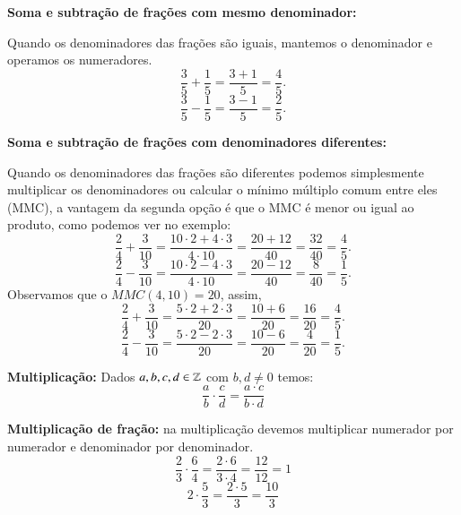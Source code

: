  \vskip0.3cm

 \begin{exem}
  \textbf{Soma e subtração de frações com mesmo denominador:}

   Quando os denominadores das frações são iguais, mantemos o denominador e operamos os numeradores.
    \vskip0.3cm
   \[\frac{3}{5} + \frac{1}{5}= \frac{3+1}{5}= \frac{4}{5} .\]
    \vskip0.3cm
   \[\frac{3}{5} - \frac{1}{5}= \frac{3-1}{5}= \frac{2}{5} .\]
 \end{exem}

 \begin{exem}
 \textbf{Soma e subtração de frações com denominadores diferentes:}

   Quando os denominadores das frações são diferentes podemos simplesmente multiplicar os denominadores ou calcular o mínimo múltiplo comum entre eles (MMC), a vantagem da segunda opção é que o MMC é menor ou igual ao produto, como podemos ver no exemplo:
    \vskip0.3cm
   \[\frac{2}{4} + \frac{3}{10}= \frac{10 \cdot 2 + 4 \cdot 3}{4 \cdot 10}= \frac{20 + 12}{40}= \frac{32}{40}= \frac{4}{5} .\]
    \vskip0.3cm
   \[\frac{2}{4} - \frac{3}{10}= \frac{10 \cdot 2 - 4 \cdot 3}{4 \cdot 10}= \frac{20 - 12}{40}= \frac{8}{40}= \frac{1}{5} .\]
    \vskip0.3cm
   Observamos que o $MMC(4, 10)= 20$, assim,
    \vskip0.3cm
   \[\frac{2}{4} + \frac{3}{10}= \frac{5 \cdot 2 + 2 \cdot 3}{20}= \frac{10+6}{20}= \frac{16}{20}=\frac{4}{5} .\]
    \vskip0.3cm
   \[\frac{2}{4} - \frac{3}{10}= \frac{5 \cdot 2 - 2 \cdot 3}{20}= \frac{10 - 6}{20}= \frac{4}{20}=\frac{1}{5} .\]
 \end{exem}


 \vskip0.5cm

 \colorbox{azul}{
 \begin{minipage}{0.9\linewidth}
 \begin{center}
  \textbf{Multiplicação:} Dados $a, b, c, d \in \mathbb{Z}$ com $b, d \neq 0$ temos:
 \[\frac{a}{b} \cdot \frac{c}{d}= \frac{a \cdot c}{b \cdot d} \]
 \end{center}
 \end{minipage}}

 \vskip0.3cm
 \begin{exem}
  \textbf{Multiplicação de fração:} na multiplicação devemos multiplicar numerador por numerador e denominador por denominador.
   \[\frac{2}{3} \cdot \frac{6}{4}= \frac{2 \cdot 6}{3 \cdot 4}= \frac{12}{12}= 1 \]
   \[2 \cdot \frac{5}{3}= \frac{2 \cdot 5}{3}= \frac{10}{3}\]
 \end{exem}

